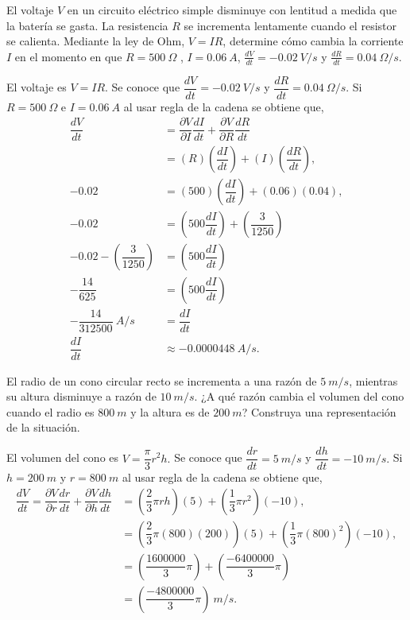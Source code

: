 \begin{prob}
El voltaje $V$ en un circuito eléctrico simple disminuye con lentitud a medida que la batería se gasta. La resistencia $R$ se incrementa lentamente cuando el resistor se calienta. Mediante la ley de Ohm, $V=IR$, determine cómo cambia la corriente $I$ en el momento en que $R=500\ \Omega$ , $I=0.06\  A$, $\frac{dV}{dt}=-0.02\ V/s$ y $\frac{dR}{dt}=0.04\ \Omega /s.$
\begin{myproof}
El voltaje es $V=IR.$ Se conoce que $\dfrac{dV}{dt}=-0.02 \ V/s$ y $\dfrac{dR}{dt}=0.04\ \Omega/s.$ Si $R=500\ \Omega$ e $I=0.06\ A$ al usar regla de la cadena se obtiene que,
\begin{align*}
\dfrac{dV}{dt}&=\dfrac{\partial V}{\partial I}\dfrac{dI}{dt}+\dfrac{\partial V}{\partial R}\dfrac{dR}{dt}\\&=\left(R\right)\left(\dfrac{dI}{dt}\right)+\left(I\right)\left(\dfrac{dR}{dt}\right),\\
-0.02&=\left(500\right)\left(\dfrac{dI}{dt}\right)+\left(0.06\right)\left(0.04\right),\\-0.02&=\left( 500\dfrac{dI}{dt} \right)+\left( \dfrac{3}{1250}  \right)\\-0.02-\left( \dfrac{3}{1250}  \right)&=\left( 500\dfrac{dI}{dt} \right)\\-\dfrac{14}{625}&=\left( 500\dfrac{dI}{dt} \right)\\-\dfrac{14}{312500}\ A/s&=\dfrac{dI}{dt}\\\dfrac{dI}{dt}&\approx -0.0000448\ A/s.
\end{align*}
\end{myproof}
\end{prob}

\begin{prob}
El radio de un cono circular recto se incrementa a una razón de $5\ m/s$, mientras su altura disminuye a razón de $10\ m/s$. ¿A qué razón cambia el volumen del cono cuando el radio es $800\ m$ y la altura es de $200\ m$? Construya una representación de la situación.
\begin{myproof}
El volumen del cono es $V=\dfrac{\pi}{3}r^2h.$ Se conoce que $\dfrac{dr}{dt}=5 \ m/s$ y $\dfrac{dh}{dt}=-10\ m/s.$ Si $h=200\ m$ y $r=800\ m$ al usar regla de la cadena se obtiene que,
\begin{align*}
\dfrac{dV}{dt}=\dfrac{\partial V}{\partial r}\dfrac{dr}{dt}+\dfrac{\partial V}{\partial h}\dfrac{dh}{dt}&=\left(\dfrac{2}{3}\pi r h\right)\left(5\right)+\left(\dfrac{1}{3}\pi r^2\right)\left(-10\right),\\
&=\left(\dfrac{2}{3}\pi (800) (200)\right)\left(5\right)+\left(\dfrac{1}{3}\pi (800)^2\right)\left(-10\right),\\&=\left(\dfrac{1600000}{3}\pi\right)+\left(\dfrac{-6400000}{3}\pi\right)\\&=\left(\dfrac{-4800000}{3}\pi\right)\ m/s.
\end{align*}
\end{myproof}
\end{prob}

